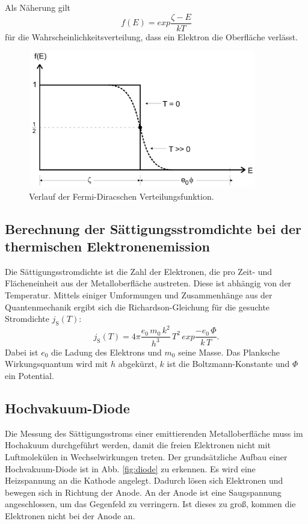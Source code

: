 \noindent Als Näherung gilt 
\begin{equation}
    f(E) = exp{\frac{\zeta - E}{k T}}
    \label{eqn:fermidirac}
\end{equation}
für die Wahrscheinlichkeitsverteilung, dass ein Elektron die 
Oberfläche  verlässt. 

\begin{figure}
    \centering
    \includegraphics[width=10cm, height=6cm]{build/fermidirac.png}
    \caption{Verlauf der Fermi-Diracschen Verteilungsfunktion. \cite{V504}}
    \label{fig:fermidirac}
\end{figure}

\subsection{Berechnung der Sättigungsstromdichte bei der 
thermischen Elektronenemission}

Die Sättigungsstromdichte ist die Zahl der 
Elektronen, die pro Zeit- und Flächeneinheit aus der 
Metalloberfläche austreten. Diese ist abhängig von der 
Temperatur. Mittels einiger Umformungen und 
Zusammenhänge aus der Quantenmechanik ergibt sich die 
Richardson-Gleichung für die gesuchte Stromdichte $j_\text{S}(T)$:
\begin{equation}
    j_\text{S}(T)= 4 \pi \frac{e_0 \, m_0 \, k^2}{h^3} \, T^2 \, exp{\frac{-e_0 \, \Phi}{k \, T}}.
    \label{eqn:richardson}
\end{equation} 
Dabei ist $e_0$ die Ladung des Elektrons und $m_0$ seine Masse. 
Das Planksche Wirkungsquantum wird mit $h$ abgekürzt, $k$ ist 
die Boltzmann-Konstante und $\Phi$ ein Potential. %

\subsection{Hochvakuum-Diode}

Die Messung des Sättigungsstroms einer emittierenden 
Metalloberfläche muss im Hochakuum durchgeführt werden, 
damit die freien Elektronen nicht mit Luftmolekülen in 
Wechselwirkungen treten. Der grundsätzliche Aufbau einer 
Hochvakuum-Diode ist in Abb. \ref{fig:diode} zu erkennen.
Es wird eine Heizspannung an die Kathode angelegt. Dadurch 
lösen sich Elektronen und bewegen sich in Richtung der Anode. 
An der Anode ist eine Saugspannung angeschlossen, um das 
Gegenfeld zu verringern. Ist dieses zu groß, kommen die 
Elektronen nicht bei der Anode an. 

